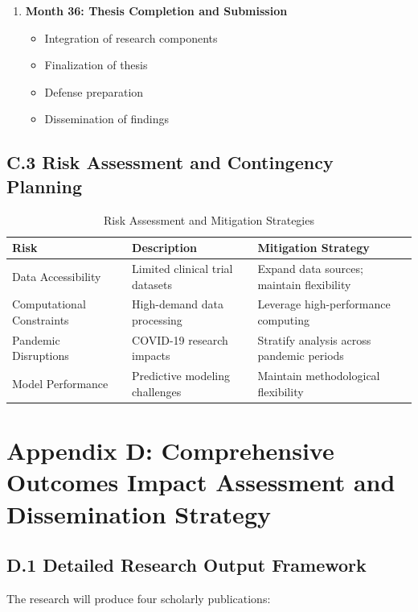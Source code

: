 \documentclass[12pt,a4paper,landscape]{article}
\begin{document}
\begin{enumerate}[leftmargin=*, itemsep=0.5em]
    \item \textbf{Month 36: Thesis Completion and Submission}
    \begin{itemize}[leftmargin=*]
        \item Integration of research components
        \item Finalization of thesis
        \item Defense preparation
        \item Dissemination of findings
    \end{itemize}
\end{enumerate}

\subsection*{C.3 Risk Assessment and Contingency Planning}
\begin{table}[H]
    \centering
    \caption{Risk Assessment and Mitigation Strategies}
    \label{tab:risks}
    \begin{tabular}{L{3cm}L{6cm}L{6cm}}
        \toprule
        \textbf{Risk} & \textbf{Description} & \textbf{Mitigation Strategy} \\
        \midrule
        Data Accessibility & Limited clinical trial datasets & Expand data sources; maintain flexibility \\
        \addlinespace
        Computational Constraints & High-demand data processing & Leverage high-performance computing \\
        \addlinespace
        Pandemic Disruptions & COVID-19 research impacts & Stratify analysis across pandemic periods \\
        \addlinespace
        Model Performance & Predictive modeling challenges & Maintain methodological flexibility \\
        \bottomrule
    \end{tabular}
\end{table}

\clearpage
\section*{Appendix D: Comprehensive Outcomes Impact Assessment and Dissemination Strategy}

\subsection*{D.1 Detailed Research Output Framework}
The research will produce four scholarly publications:
\end{document}
